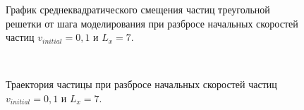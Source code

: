 \documentclass[14pt,a4paper,report]{ncc}
\begin{document}
\begin{figure}[]
\caption{График среднеквадратического смещения частиц треугольной решетки от шага моделирования при разбросе начальных скоростей частиц  $v_{initial} = 0,1 $ и  $L_x=7$.}
\label{ris:image17}
\end{figure}
\

\begin{figure}[]
\caption{Траектория частицы при разбросе начальных скоростей частиц $v_{initial} = 0,1$ и  $L_x=7$.}
\label{ris:image18}
\end{figure}

\
\end{document}
